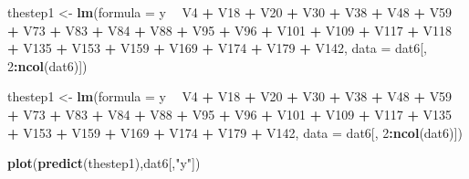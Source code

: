 \documentclass[
]{article}
\newenvironment{Shaded}{\begin{snugshade}}{\end{snugshade}}
\newcommand{\DataTypeTok}[1]{\textcolor[rgb]{0.13,0.29,0.53}{#1}}
\newcommand{\DecValTok}[1]{\textcolor[rgb]{0.00,0.00,0.81}{#1}}
\newcommand{\KeywordTok}[1]{\textcolor[rgb]{0.13,0.29,0.53}{\textbf{#1}}}
\newcommand{\NormalTok}[1]{#1}
\newcommand{\OperatorTok}[1]{\textcolor[rgb]{0.81,0.36,0.00}{\textbf{#1}}}
\newcommand{\StringTok}[1]{\textcolor[rgb]{0.31,0.60,0.02}{#1}}
\begin{document}
\begin{Shaded}
\begin{Highlighting}[]
\NormalTok{thestep1 <-}\StringTok{ }\KeywordTok{lm}\NormalTok{(}\DataTypeTok{formula =}\NormalTok{ y }\OperatorTok{~}\StringTok{ }\NormalTok{V4 }\OperatorTok{+}\StringTok{ }\NormalTok{V18 }\OperatorTok{+}\StringTok{ }\NormalTok{V20 }\OperatorTok{+}\StringTok{ }\NormalTok{V30 }\OperatorTok{+}\StringTok{ }\NormalTok{V38 }\OperatorTok{+}\StringTok{ }\NormalTok{V48 }\OperatorTok{+}\StringTok{  }
\StringTok{    }\NormalTok{V59 }\OperatorTok{+}\StringTok{ }\NormalTok{V73 }\OperatorTok{+}\StringTok{ }\NormalTok{V83 }\OperatorTok{+}\StringTok{ }\NormalTok{V84 }\OperatorTok{+}\StringTok{ }\NormalTok{V88 }\OperatorTok{+}\StringTok{ }\NormalTok{V95 }\OperatorTok{+}\StringTok{ }\NormalTok{V96 }\OperatorTok{+}\StringTok{ }\NormalTok{V101 }\OperatorTok{+}\StringTok{ }\NormalTok{V109 }\OperatorTok{+}\StringTok{ }
\StringTok{    }\NormalTok{V117 }\OperatorTok{+}\StringTok{ }\NormalTok{V118 }\OperatorTok{+}\StringTok{ }\NormalTok{V135 }\OperatorTok{+}\StringTok{ }\NormalTok{V153 }\OperatorTok{+}\StringTok{ }\NormalTok{V159 }\OperatorTok{+}\StringTok{ }\NormalTok{V169 }\OperatorTok{+}\StringTok{ }
\StringTok{    }\NormalTok{V174 }\OperatorTok{+}\StringTok{ }\NormalTok{V179 }\OperatorTok{+}\StringTok{ }\NormalTok{V142, }\DataTypeTok{data =}\NormalTok{ dat6[, }\DecValTok{2}\OperatorTok{:}\KeywordTok{ncol}\NormalTok{(dat6)])}

\NormalTok{thestep1 <-}\StringTok{ }\KeywordTok{lm}\NormalTok{(}\DataTypeTok{formula =}\NormalTok{ y }\OperatorTok{~}\StringTok{ }\NormalTok{V4 }\OperatorTok{+}\StringTok{ }\NormalTok{V18 }\OperatorTok{+}\StringTok{ }\NormalTok{V20 }\OperatorTok{+}\StringTok{ }\NormalTok{V30 }\OperatorTok{+}\StringTok{ }\NormalTok{V38 }\OperatorTok{+}\StringTok{ }\NormalTok{V48 }\OperatorTok{+}\StringTok{  }
\StringTok{    }\NormalTok{V59 }\OperatorTok{+}\StringTok{ }\NormalTok{V73 }\OperatorTok{+}\StringTok{ }\NormalTok{V83 }\OperatorTok{+}\StringTok{ }\NormalTok{V84 }\OperatorTok{+}\StringTok{ }\NormalTok{V88 }\OperatorTok{+}\StringTok{ }\NormalTok{V95 }\OperatorTok{+}\StringTok{ }\NormalTok{V96 }\OperatorTok{+}\StringTok{ }\NormalTok{V101 }\OperatorTok{+}\StringTok{ }\NormalTok{V109 }\OperatorTok{+}\StringTok{ }
\StringTok{    }\NormalTok{V117 }\OperatorTok{+}\StringTok{ }\NormalTok{V135 }\OperatorTok{+}\StringTok{ }\NormalTok{V153 }\OperatorTok{+}\StringTok{ }\NormalTok{V159 }\OperatorTok{+}\StringTok{ }\NormalTok{V169 }\OperatorTok{+}\StringTok{ }
\StringTok{    }\NormalTok{V174 }\OperatorTok{+}\StringTok{ }\NormalTok{V179 }\OperatorTok{+}\StringTok{ }\NormalTok{V142, }\DataTypeTok{data =}\NormalTok{ dat6[, }\DecValTok{2}\OperatorTok{:}\KeywordTok{ncol}\NormalTok{(dat6)])}

\KeywordTok{plot}\NormalTok{(}\KeywordTok{predict}\NormalTok{(thestep1),dat6[,}\StringTok{"y"}\NormalTok{])}
\end{Highlighting}
\end{Shaded}
\end{document}
